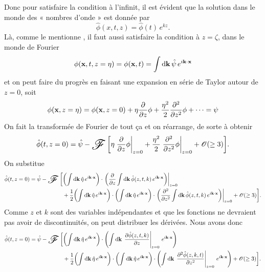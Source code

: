 \documentclass[10pt]{article}
\numberwithin{equation}{section}
\newcommand{\xx}{\vb{x}}
\newcommand{\fourier}{\operatorname{\raisebox{-0.4em}{\resizebox{2em}{!}{$\mathscr{F}$}}}}
\begin{document}
Donc pour satisfaire la condition à l'infinit, il est évident que la solution dans le monde des « nombres d'onde »  est donnée par
\begin{equation}
\label{eq:org8e93cf6}
   \hat{\phi}(x, t, z) =  \hat{\phi}(t)\,e^{kz}.
\end{equation}
Là, comme le mentionne \Textcite{Janssen2004chap4}, il faut aussi satisfaire la condition à \(z=\zeta\), dans le monde de Fourier
\begin{equation}
   \phi(\xx,t,z = \eta) = \phi(\xx,t) = \int\dd\vb{k}\, \hat{\psi}\, e^{i\vb{k}\cdot\xx}
\end{equation}
et on peut faire du progrès en faisant une expansion en série de Taylor autour de \(z = 0\), soit
\begin{equation}
   \phi(\xx,z = \eta) = \phi(\xx,z=0) + \eta \pdv{}{z}\phi + \frac{\eta^2}{2}\pdv[2]{}{z}\phi + \cdots = \psi
\end{equation}
On fait la transformée de Fourier de tout ça et on réarrange, de sorte à obtenir
\begin{equation}
   \hat{\phi}(t,z=0) = \hat{\psi} - \fourier \qty[\eta \eval{\pdv{}{z}\phi}_{z=0} + \frac{\eta^2}{2}\eval{\pdv[2]{}{z}\phi}_{z=0} + \mathscr{O}(\geq3)].
\end{equation}
On substitue
\begin{align}
   \hat{\phi}(t,z=0) = \hat{\psi} - \fourier\bigg[&\qty(\int \dd\vb{k}\, \hat{\eta}\, e^{i\vb{k}\cdot\xx}) \cdot\eval{\qty(\pdv{}{z}\int\dd\vb{k}\,\hat{\phi}(z,t,k)\,e^{i\vb{k}\cdot\xx})}_ {z=0}\nonumber\\
   &+\frac{1}{2}\qty(\int \dd\vb{k}\, \hat{\eta}\, e^{i\vb{k}\cdot\xx})\cdot\qty(\int \dd\vb{k}\, \hat{\eta}\, e^{i\vb{k}\cdot\xx})\cdot \eval{\qty(\pdv[2]{}{z}\int\dd\vb{k}\,\hat{\phi}(z,t,k)\,e^{i\vb{k}\cdot\xx})}_{z=0}
   +\mathscr{O}(\geq3)\bigg].
\end{align}
Comme \(z\) et \(k\) sont des variables indépendantes et que les fonctions ne devraient pas avoir de discontinuités, on peut distribuer les dérivées.
Nous avons donc
\begin{align}
   \hat{\phi}(t,z=0) = \hat{\psi} - \fourier\bigg[&\qty(\int \dd\vb{k}\, \hat{\eta}\, e^{i\vb{k}\cdot\xx}) \cdot\qty(\int\dd\vb{k}\,\eval{\pdv{\hat{\phi}(z,t,k)}{z}}_{z=0}\,e^{i\vb{k}\cdot\xx})\nonumber\\
   &+\frac{1}{2}\qty(\int \dd\vb{k}\, \hat{\eta}\, e^{i\vb{k}\cdot\xx})\cdot\qty(\int \dd\vb{k}\, \hat{\eta}\, e^{i\vb{k}\cdot\xx})\cdot \qty(\int\dd\vb{k}\,\eval{\pdv[2]{\hat{\phi}(z,k,t)}{z}}_{z=0}\,e^{i\vb{k}\cdot\xx})
   +\mathscr{O}(\geq3)\bigg].
\end{align}
\end{document}
